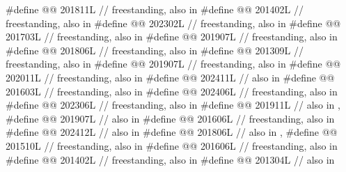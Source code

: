 \begin{codeblock}
#define @@             201811L // freestanding, also in 
#define @@                          201402L // freestanding, also in 
#define @@              202302L // freestanding, also in 
#define @@                      201703L // freestanding, also in 
#define @@              201907L // freestanding, also in 
#define @@            201806L // freestanding, also in 
#define @@                   201309L // freestanding, also in 
#define @@       201907L // freestanding, also in 
#define @@                    202011L // freestanding, also in 
#define @@           202411L // also in 
#define @@                      201603L // freestanding, also in 
#define @@                202406L // freestanding, also in 
#define @@                202306L // freestanding, also in 
#define @@                           201911L // also in , 
#define @@                             201907L // also in 
#define @@                           201606L // freestanding, also in 
#define @@                            202412L // also in 
#define @@           201806L // also in , 
#define @@                    201510L // freestanding, also in 
#define @@                   201606L // freestanding, also in 
#define @@             201402L // freestanding, also in 
#define @@                       201304L // also in 

\end{codeblock}
